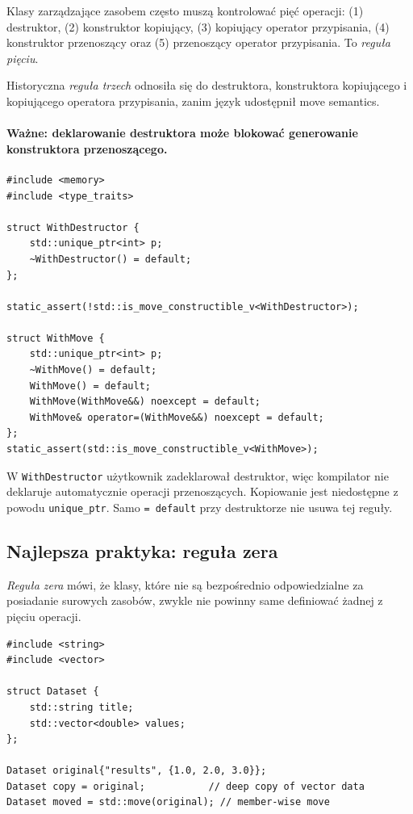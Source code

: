 Klasy zarządzające zasobem często muszą kontrolować pięć operacji:
(1) destruktor, (2) konstruktor kopiujący, (3) kopiujący operator
przypisania, (4) konstruktor przenoszący oraz (5) przenoszący
operator przypisania. To \emph{reguła pięciu}.

Historyczna \emph{reguła trzech} odnosiła się do destruktora,
konstruktora kopiującego i kopiującego operatora przypisania,
zanim język udostępnił move semantics.

\paragraph{Ważne: deklarowanie destruktora może blokować generowanie
konstruktora przenoszącego.}

\begin{lstlisting}
#include <memory>
#include <type_traits>

struct WithDestructor {
    std::unique_ptr<int> p;
    ~WithDestructor() = default;
};

static_assert(!std::is_move_constructible_v<WithDestructor>);

struct WithMove {
    std::unique_ptr<int> p;
    ~WithMove() = default;
    WithMove() = default;
    WithMove(WithMove&&) noexcept = default;
    WithMove& operator=(WithMove&&) noexcept = default;
};
static_assert(std::is_move_constructible_v<WithMove>);
\end{lstlisting}

W \texttt{WithDestructor} użytkownik zadeklarował destruktor,
więc kompilator nie deklaruje automatycznie operacji przenoszących.
Kopiowanie jest niedostępne z powodu \texttt{unique\_ptr}.
Samo \texttt{= default} przy destruktorze nie usuwa tej reguły.

\subsection{Najlepsza praktyka: reguła zera}

\emph{Reguła zera} mówi, że klasy, które nie są bezpośrednio
odpowiedzialne za posiadanie surowych zasobów, zwykle nie powinny
same definiować żadnej z pięciu operacji.

\begin{lstlisting}
#include <string>
#include <vector>

struct Dataset {
    std::string title;
    std::vector<double> values;
};

Dataset original{"results", {1.0, 2.0, 3.0}};
Dataset copy = original;           // deep copy of vector data
Dataset moved = std::move(original); // member-wise move
\end{lstlisting}

